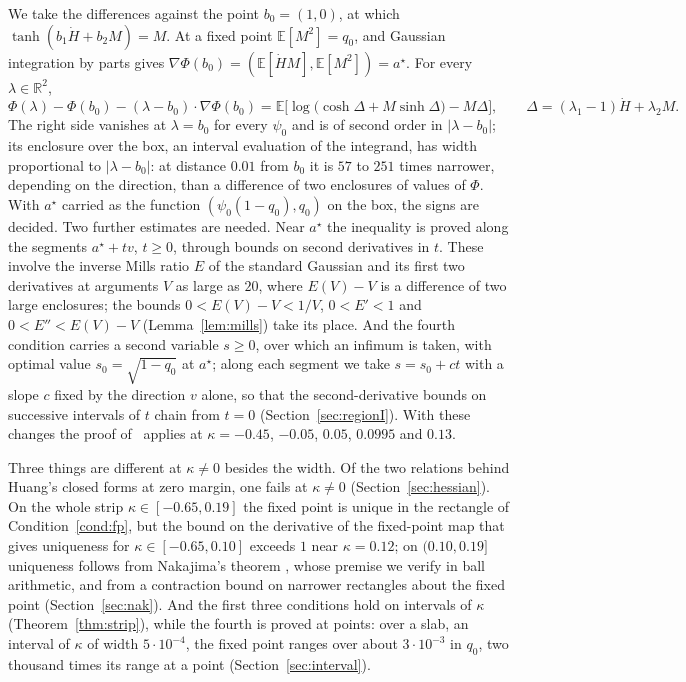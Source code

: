 \documentclass[11pt]{article}
\theoremstyle{remark}
\newcommand{\E}{\mathbb{E}}
\newcommand{\R}{\mathbb{R}}
\begin{document}
We take the differences against the point $b_0=(1,0)$, at which
$\tanh(b_1\dot H+b_2M)=M$.  At a fixed point $\E[M^2]=q_0$, and Gaussian integration by parts
gives $\nabla\Phi(b_0)=(\E[\dot HM],\E[M^2])=a^\star$.  For every $\lambda\in\R^2$,
\begin{equation}\label{eq:anchor}
\Phi(\lambda)-\Phi(b_0)-(\lambda-b_0)\cdot\nabla\Phi(b_0)
=\E\bigl[\log\bigl(\cosh\Delta+M\sinh\Delta\bigr)-M\Delta\bigr],
\qquad \Delta=(\lambda_1-1)\dot H+\lambda_2M .
\end{equation}
The right side vanishes at $\lambda=b_0$ for every $\psi_0$ and is of second order in
$|\lambda-b_0|$; its enclosure over the box, an interval evaluation of the integrand, has
width proportional to $|\lambda-b_0|$: at distance $0.01$ from $b_0$ it is $57$ to $251$ times
narrower, depending on the direction, than a difference of two enclosures of values of $\Phi$.
With $a^\star$ carried as the function $(\psi_0(1-q_0),q_0)$ on the box, the signs are decided.
Two further estimates are needed.  Near $a^\star$ the inequality is proved along the segments
$a^\star+tv$, $t\ge0$, through bounds on second derivatives in $t$.  These involve the inverse
Mills ratio $E$ of the standard Gaussian and its first two derivatives at arguments $V$ as large
as $20$, where $E(V)-V$ is a difference of two large enclosures; the bounds $0<E(V)-V<1/V$,
$0<E'<1$ and $0<E''<E(V)-V$ (Lemma~\ref{lem:mills}) take its place.  And the fourth condition
carries a second variable $s\ge0$, over which an infimum is taken, with optimal value
$s_0=\sqrt{1-q_0}$ at $a^\star$; along each segment we take $s=s_0+ct$ with a slope $c$ fixed by
the direction $v$ alone, so that the second-derivative bounds on successive intervals of $t$
chain from $t=0$ (Section~\ref{sec:regionI}).  With these changes the proof
of~\cite{shmalo2026capacity} applies at $\kappa=-0.45$, $-0.05$, $0.05$, $0.0995$ and $0.13$.

Three things are different at $\kappa\ne0$ besides the width.  Of the
two relations behind Huang's closed forms at zero margin, one fails at
$\kappa\ne0$ (Section~\ref{sec:hessian}).
On the whole strip $\kappa\in[-0.65,0.19]$ the fixed point is unique in
the rectangle of Condition~\ref{cond:fp}, but the bound on the derivative
of the fixed-point map that gives
uniqueness for $\kappa\in[-0.65,0.10]$ exceeds $1$ near $\kappa=0.12$;
on $(0.10,0.19]$ uniqueness follows from Nakajima's theorem
\cite[Theorem~1]{nakajima2025}, whose premise we verify in ball
arithmetic, and from a contraction bound on narrower rectangles about
the fixed point (Section~\ref{sec:nak}).  And the first three
conditions hold on intervals of $\kappa$ (Theorem~\ref{thm:strip}),
while the fourth is proved at points: over a slab, an interval of
$\kappa$ of width $5\cdot10^{-4}$, the fixed point ranges over about
$3\cdot10^{-3}$ in $q_0$, two thousand times its range at a point
(Section~\ref{sec:interval}).
\end{document}
